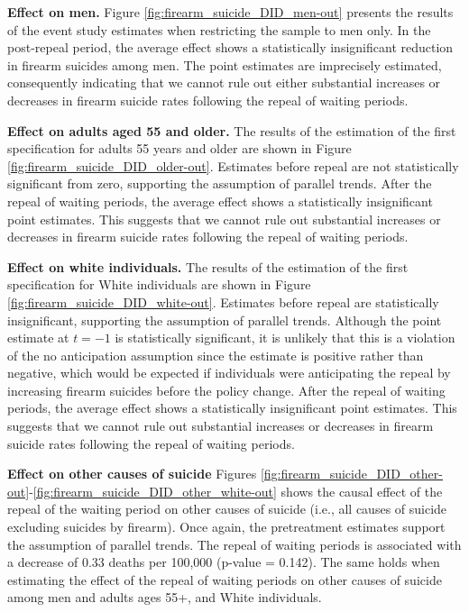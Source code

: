 \textbf{Effect on men.} Figure \ref{fig:firearm_suicide_DID_men-out} presents the results of the event study estimates when restricting the sample to men only. In the post-repeal period, the average effect shows a statistically insignificant reduction in firearm suicides among men. The point estimates are imprecisely estimated, consequently indicating that we cannot rule out either substantial increases or decreases in firearm suicide rates following the repeal of waiting periods.

\textbf{Effect on adults aged 55 and older. } The results of the estimation of the first specification for adults 55 years and older are shown in Figure \ref{fig:firearm_suicide_DID_older-out}. Estimates before repeal are not statistically significant from zero, supporting the assumption of parallel trends. After the repeal of waiting periods, the average effect shows a statistically insignificant point estimates. This suggests that we cannot rule out substantial increases or decreases in firearm suicide rates following the repeal of waiting periods.

\textbf{Effect on white individuals.} The results of the estimation of the first specification for White individuals are shown in Figure \ref{fig:firearm_suicide_DID_white-out}. Estimates before repeal are statistically insignificant, supporting the assumption of parallel trends. Although the point estimate at $t=-1$ is statistically significant, it is unlikely that this is a violation of the no anticipation assumption since the estimate is positive rather than negative, which would be expected if individuals were anticipating the repeal by increasing firearm suicides before the policy change. After the repeal of waiting periods, the average effect shows a statistically insignificant point estimates. This suggests that we cannot rule out substantial increases or decreases in firearm suicide rates following the repeal of waiting periods.

\textbf{Effect on other causes of suicide} Figures \ref{fig:firearm_suicide_DID_other-out}-\ref{fig:firearm_suicide_DID_other_white-out} shows the causal effect of the repeal of the waiting period on other causes of suicide (i.e., all causes of suicide excluding suicides by firearm). Once again, the pretreatment estimates support the assumption of parallel trends. The repeal of waiting periods is associated with a decrease of 0.33 deaths per 100,000 (p-value = 0.142). The same holds when estimating the effect of the repeal of waiting periods on other causes of suicide among men and adults ages 55+, and White individuals. 

